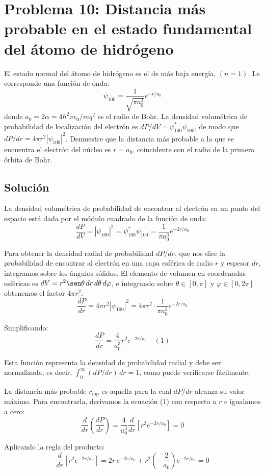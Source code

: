 \documentclass[a4paper]{article}
\begin{document}
\section{Problema 10: Distancia más probable en el estado fundamental del átomo de hidrógeno}

El estado normal del átomo de hidrógeno es el de más baja energía, $(n = 1)$. Le corresponde una función de onda:
$$\psi_{100} = \frac{1}{\sqrt{\pi a_0^3}} e^{-r/a_0}$$
donde $a_0 = 2\alpha = 4\hbar^2\pi\epsilon_0/mq^2$ es el radio de Bohr. La densidad volumétrica de probabilidad de localización del electrón es $dP/dV = \psi_{100}^*\psi_{100}$, de modo que $dP/dr = 4\pi r^2|\psi_{100}|^2$. Demuestre que la distancia más probable a la que se encuentra el electrón del núcleo es $r = a_0$, coincidente con el radio de la primera órbita de Bohr.

\subsection{Solución}

La densidad volumétrica de probabilidad de encontrar al electrón en un punto del espacio está dada por el módulo cuadrado de la función de onda:
$$\frac{dP}{dV} = |\psi_{100}|^2 = \psi_{100}^*\psi_{100} = \frac{1}{\pi a_0^3} e^{-2r/a_0}$$

Para obtener la densidad radial de probabilidad $dP/dr$, que nos dice la probabilidad de encontrar al electrón en una capa esférica de radio $r$ y espesor $dr$, integramos sobre los ángulos sólidos. El elemento de volumen en coordenadas esféricas es $dV = r^2 \sen\theta \, dr \, d\theta \, d\varphi$, e integrando sobre $\theta \in [0, \pi]$ y $\varphi \in [0, 2\pi]$ obtenemos el factor $4\pi r^2$:
$$\frac{dP}{dr} = 4\pi r^2 |\psi_{100}|^2 = 4\pi r^2 \cdot \frac{1}{\pi a_0^3} e^{-2r/a_0}$$

Simplificando:
$$\frac{dP}{dr} = \frac{4}{a_0^3} r^2 e^{-2r/a_0} \quad (1)$$

Esta función representa la densidad de probabilidad radial y debe ser normalizada, es decir, $\int_0^\infty (dP/dr) \, dr = 1$, como puede verificarse fácilmente.

La distancia más probable $r_{\text{mp}}$ es aquella para la cual $dP/dr$ alcanza su valor máximo. Para encontrarla, derivamos la ecuación (1) con respecto a $r$ e igualamos a cero:
$$\frac{d}{dr}\left(\frac{dP}{dr}\right) = \frac{4}{a_0^3} \frac{d}{dr}\left[r^2 e^{-2r/a_0}\right] = 0$$

Aplicando la regla del producto:
$$\frac{d}{dr}\left[r^2 e^{-2r/a_0}\right] = 2r \, e^{-2r/a_0} + r^2 \left(-\frac{2}{a_0}\right) e^{-2r/a_0} = 0$$
\end{document}
